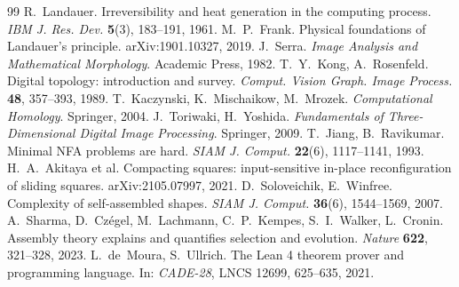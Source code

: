 \documentclass[11pt,a4paper]{article}
\theoremstyle{plain}
\theoremstyle{definition}
\theoremstyle{remark}
\begin{document}
\begin{thebibliography}{99}
 R.~Landauer. Irreversibility and heat generation in the computing process. \emph{IBM J. Res. Dev.} \textbf{5}(3), 183--191, 1961.
 M.~P.~Frank. Physical foundations of Landauer's principle. arXiv:1901.10327, 2019.
 J.~Serra. \emph{Image Analysis and Mathematical Morphology}. Academic Press, 1982.
 T.~Y.~Kong, A.~Rosenfeld. Digital topology: introduction and survey. \emph{Comput. Vision Graph. Image Process.} \textbf{48}, 357--393, 1989.
 T.~Kaczynski, K.~Mischaikow, M.~Mrozek. \emph{Computational Homology}. Springer, 2004.
 J.~Toriwaki, H.~Yoshida. \emph{Fundamentals of Three-Dimensional Digital Image Processing}. Springer, 2009.
 T.~Jiang, B.~Ravikumar. Minimal NFA problems are hard. \emph{SIAM J. Comput.} \textbf{22}(6), 1117--1141, 1993.
 H.~A.~Akitaya et al. Compacting squares: input-sensitive in-place reconfiguration of sliding squares. arXiv:2105.07997, 2021.
 D.~Soloveichik, E.~Winfree. Complexity of self-assembled shapes. \emph{SIAM J. Comput.} \textbf{36}(6), 1544--1569, 2007.
 A.~Sharma, D.~Czégel, M.~Lachmann, C.~P.~Kempes, S.~I.~Walker, L.~Cronin. Assembly theory explains and quantifies selection and evolution. \emph{Nature} \textbf{622}, 321--328, 2023.
 L.~de~Moura, S.~Ullrich. The Lean 4 theorem prover and programming language. In: \emph{CADE-28}, LNCS 12699, 625--635, 2021.
\end{thebibliography}
\end{document}
